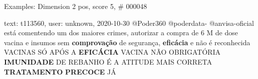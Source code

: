 \begin{frame}{Examples: Dimension 2 pos, score 5, \# 000048}
\footnotesize
\begin{exampleblock}{text: t113560, user: unknown, 2020-10-30}
@Poder360 @poderdata- @anvisa-oficial está comentendo um dos maiores crimes, 
autorizar a compra de 6 M de dose vacina e insumos sem \textbf{comprovação} de 
segurança, \textbf{eficácia} e não é reconhecida VACINAS SÓ APÓS A 
\textbf{EFICÁCIA} VACINA NÃO OBRIGATÓRIA \textbf{IMUNIDADE} DE REBANHO É A 
ATITUDE MAIS CORRETA \textbf{TRATAMENTO} \textbf{PRECOCE} JÁ 
\end{exampleblock}
\end{frame}
